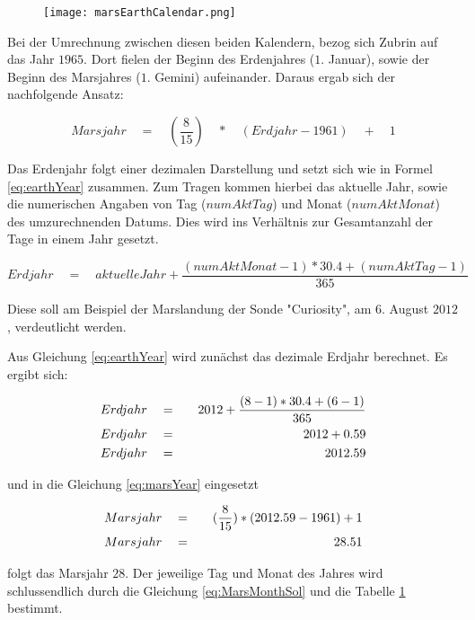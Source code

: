 \begin{figure}[H]
	\centering
	\texttt{[image: marsEarthCalendar.png]}
	\label{fig:marsEarthCalendar}
\end{figure}

Bei der Umrechnung zwischen diesen beiden Kalendern, bezog sich Zubrin auf das
Jahr $1965$. Dort fielen der Beginn des Erdenjahres ($1.$ Januar), sowie der
Beginn des Marsjahres ($1.$ Gemini) aufeinander. Daraus ergab sich der
nachfolgende Ansatz:

\begin{equation}
	Marsjahr \quad = \quad (\frac{8}{15}) \quad * \quad (Erdjahr - 1961) \quad + \quad 1
	\label{eq:marsYear}
\end{equation}

Das Erdenjahr folgt einer dezimalen Darstellung und setzt sich wie in Formel
\ref{eq:earthYear} zusammen. Zum Tragen kommen hierbei das aktuelle Jahr, sowie
die numerischen Angaben von Tag ($numAktTag$) und Monat ($numAktMonat$) des
umzurechnenden Datums. Dies wird ins Verh{\"a}ltnis zur Gesamtanzahl der Tage in
einem Jahr gesetzt.

\begin{equation}
	Erdjahr \quad = \quad aktuelleJahr + \frac{ (numAktMonat - 1) * 30.4 + (numAktTag - 1) }{365}
	\label{eq:earthYear}
\end{equation}

Diese soll am Beispiel der Marslandung der Sonde "Curiosity", am $6.$ August
$2012$, verdeutlicht werden.

Aus Gleichung \ref{eq:earthYear} wird zun{\"a}chst das dezimale Erdjahr berechnet.
Es ergibt sich:

\begin{eqnarray}
	Erdjahr \quad & = & \quad 2012 + \frac{ (8-1) * 30.4 + (6-1) }{365} \notag\\
	Erdjahr \quad & = & \quad 2012 + 0.59 \notag\\
	Erdjahr \quad & = & \quad 2012.59
\end{eqnarray}

und in die Gleichung \ref{eq:marsYear} eingesetzt

\begin{eqnarray}
	Marsjahr \quad & = & \quad (\frac{8}{15}) * (2012.59 - 1961) + 1 \notag\\
	Marsjahr \quad & = & \quad 28.51
\end{eqnarray}

folgt das Marsjahr $28$. Der jeweilige Tag und Monat des Jahres wird
schlussendlich durch die Gleichung \ref{eq:MarsMonthSol} und die Tabelle
\ref{fig:marsEarthCalendar} bestimmt.

